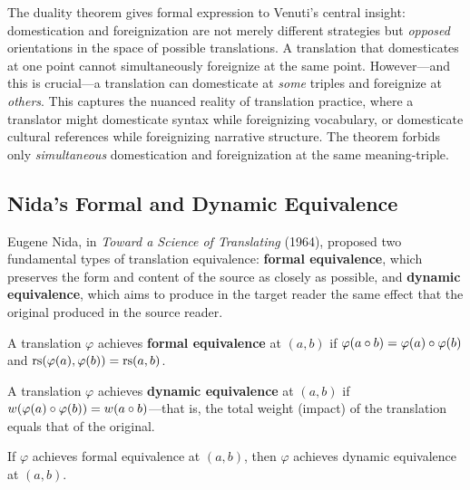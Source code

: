 \begin{interpretation}
\label{int:venuti-formal}
The duality theorem gives formal expression to Venuti's central insight:
domestication and foreignization are not merely different strategies but
\emph{opposed} orientations in the space of possible translations.  A
translation that domesticates at one point cannot simultaneously foreignize
at the same point.  However---and this is crucial---a translation can
domesticate at \emph{some} triples and foreignize at \emph{others}.  This
captures the nuanced reality of translation practice, where a translator
might domesticate syntax while foreignizing vocabulary, or domesticate
cultural references while foreignizing narrative structure.  The theorem
forbids only \emph{simultaneous} domestication and foreignization at the
same meaning-triple.
\end{interpretation}

\subsection{Nida's Formal and Dynamic Equivalence}

Eugene Nida, in \emph{Toward a Science of Translating} (1964), proposed
two fundamental types of translation equivalence: \textbf{formal
equivalence}, which preserves the form and content of the source as closely
as possible, and \textbf{dynamic equivalence}, which aims to produce in the
target reader the same effect that the original produced in the source reader.

\begin{definition}
\label{def:formal-equiv}
A translation $\varphi$ achieves \textbf{formal equivalence} at $(a, b)$
if $\varphi(a \circ b) = \varphi(a) \circ \varphi(b)$
and $\mathrm{rs}(\varphi(a), \varphi(b)) = \mathrm{rs}(a, b)$.
\end{definition}

\begin{definition}
\label{def:dynamic-equiv}
A translation $\varphi$ achieves \textbf{dynamic equivalence} at $(a, b)$ if
$w(\varphi(a) \circ \varphi(b)) = w(a \circ b)$---that is, the
total weight (impact) of the translation equals that of the original.
\end{definition}

\begin{theorem}
\label{thm:formal-dynamic-fixed}
If $\varphi$ achieves formal equivalence at $(a, b)$, then $\varphi$
achieves dynamic equivalence at $(a, b)$.
\end{theorem}

